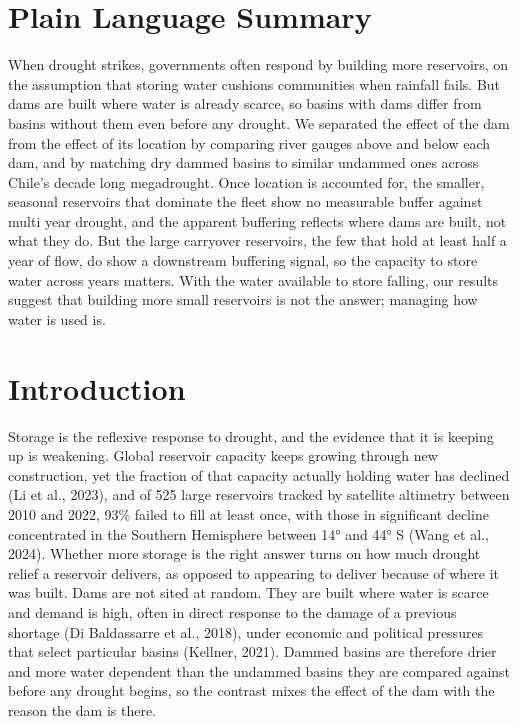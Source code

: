 \documentclass[
]{agujournal2019}
\begin{document}
\section*{Plain Language Summary}
When drought strikes, governments often respond by building more
reservoirs, on the assumption that storing water cushions communities
when rainfall fails. But dams are built where water is already scarce,
so basins with dams differ from basins without them even before any
drought. We separated the effect of the dam from the effect of its
location by comparing river gauges above and below each dam, and by
matching dry dammed basins to similar undammed ones across Chile's
decade long megadrought. Once location is accounted for, the smaller,
seasonal reservoirs that dominate the fleet show no measurable buffer
against multi year drought, and the apparent buffering reflects where
dams are built, not what they do. But the large carryover reservoirs,
the few that hold at least half a year of flow, do show a downstream
buffering signal, so the capacity to store water across years matters.
With the water available to store falling, our results suggest that
building more small reservoirs is not the answer; managing how water is
used is.




\section{Introduction}\label{introduction}

Storage is the reflexive response to drought, and the evidence that it
is keeping up is weakening. Global reservoir capacity keeps growing
through new construction, yet the fraction of that capacity actually
holding water has declined (Li et al., 2023), and of 525 large
reservoirs tracked by satellite altimetry between 2010 and 2022, 93\%
failed to fill at least once, with those in significant decline
concentrated in the Southern Hemisphere between 14° and 44° S (Wang et
al., 2024). Whether more storage is the right answer turns on how much
drought relief a reservoir delivers, as opposed to appearing to deliver
because of where it was built. Dams are not sited at random. They are
built where water is scarce and demand is high, often in direct response
to the damage of a previous shortage (Di Baldassarre et al., 2018),
under economic and political pressures that select particular basins
(Kellner, 2021). Dammed basins are therefore drier and more water
dependent than the undammed basins they are compared against before any
drought begins, so the contrast mixes the effect of the dam with the
reason the dam is there.
\end{document}
